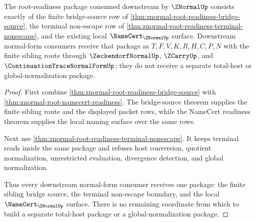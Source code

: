 \begin{theorem}
\label{thm:znormal-root-readiness-namecert-package}
The root-readiness package consumed downstream by $\ZNormalUp$ consists exactly of the finite bridge-source row of \autoref{thm:znormal-root-readiness-bridge-source}, the terminal non-escape row of \autoref{thm:znormal-root-readiness-terminal-nonescape}, and the existing local $\NameCert_{\ZNormalUp}$ surface. Downstream normal-form consumers receive that package as $T,F,V,K,R,H,C,P,N$ with the finite sibling route through $\ZeckendorfNormalUp$, $\ZCarryUp$, and $\ContinuationTraceNormalFormUp$; they do not receive a separate total-host or global-normalization package.
\end{theorem}
\begin{proof}
First combine \autoref{thm:znormal-root-readiness-bridge-source} with \autoref{thm:znormal-root-namecert-readiness}. The bridge-source theorem supplies the finite sibling route and the displayed packet rows, while the NameCert readiness theorem supplies the local naming surface over the same rows.

Next use \autoref{thm:znormal-root-readiness-terminal-nonescape}. It keeps terminal reads inside the same package and refuses host conversion, quotient normalization, unrestricted evaluation, divergence detection, and global normalization.

Thus every downstream normal-form consumer receives one package: the finite sibling bridge source, the terminal non-escape boundary, and the local $\NameCert_{\ZNormalUp}$ surface. There is no remaining coordinate from which to build a separate total-host package or a global-normalization package.
\end{proof}
